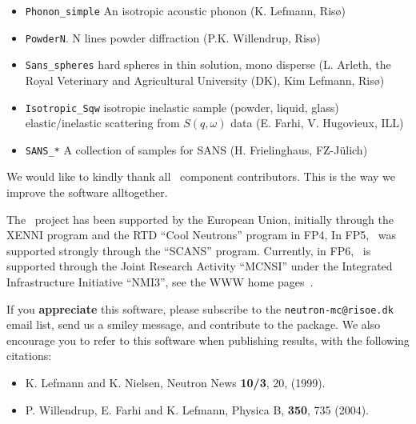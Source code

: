 \begin{itemize}
\begin{itemize}
  \item \verb+Phonon_simple+ An isotropic acoustic phonon (K. Lefmann, Ris\o)
  \item \verb+PowderN+. N lines powder diffraction (P.K. Willendrup, Ris\o)
  \item \verb+Sans_spheres+ hard spheres in thin solution, mono disperse (L. Arleth, the Royal Veterinary and Agricultural University (DK), Kim Lefmann, Ris\o )
  \item \verb+Isotropic_Sqw+ isotropic inelastic sample (powder, liquid, glass)
elastic/inelastic scattering from $S(q,\omega)$ data (E. Farhi, V. Hugovieux, ILL)
  \item \verb+SANS_*+ A collection of samples for SANS (H. Frielinghaus,  FZ-J\"ulich)
  \end{itemize}
\end{itemize}

We would like to kindly thank all \MCS\ component contributors. This is the way we improve the software alltogether.

The \MCS\ project has been supported by the European Union, initially
through the XENNI program and the RTD ``Cool Neutrons'' program in FP4,
In FP5, \MCS\ was supported strongly through the
``SCANS'' program.
Currently, in FP6, \MCS\ is supported through the Joint Research Activity
``MCNSI'' under the Integrated Infrastructure Initiative ``NMI3'', see
the WWW home pages~\cite{mcnsi_webpage,nmi3_webpage}.

If you {\bf appreciate} this software, please subscribe to the \verb+neutron-mc@risoe.dk+ email list, send us a smiley message, and contribute to the package. We also encourage you to refer to this software when publishing results, with the following citations:
\begin{itemize}
\item{K. Lefmann and K. Nielsen, Neutron News {\bf 10/3}, 20, (1999).}
\item{P. Willendrup, E. Farhi and K. Lefmann, Physica B, {\bf 350}, 735 (2004).}
\end{itemize}






